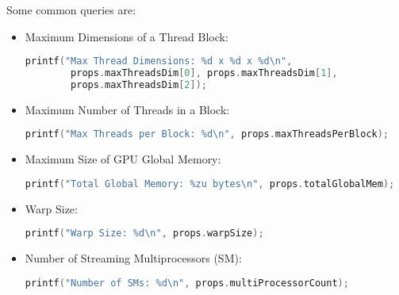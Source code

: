 \begin{examplebox}
    Some common queries are:
    \begin{itemize}
        \item Maximum Dimensions of a Thread Block:
        \begin{lstlisting}[language=C++]
printf("Max Thread Dimensions: %d x %d x %d\n",
        props.maxThreadsDim[0], props.maxThreadsDim[1],
        props.maxThreadsDim[2]);
        \end{lstlisting}

        \item Maximum Number of Threads in a Block:
        \begin{lstlisting}[language=C++]
printf("Max Threads per Block: %d\n", props.maxThreadsPerBlock);
        \end{lstlisting}

        \item Maximum Size of GPU Global Memory:
        \begin{lstlisting}[language=C++]
printf("Total Global Memory: %zu bytes\n", props.totalGlobalMem);
        \end{lstlisting}

        \item Warp Size:
        \begin{lstlisting}[language=C++]
printf("Warp Size: %d\n", props.warpSize);
        \end{lstlisting}

        \item Number of Streaming Multiprocessors (SM):
        \begin{lstlisting}[language=C++]
printf("Number of SMs: %d\n", props.multiProcessorCount);
        \end{lstlisting}

    \end{itemize}
\end{examplebox}
